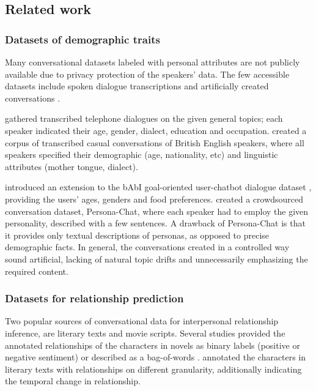 \subsection{Related work}

\subsubsection{Datasets of demographic traits} 

Many conversational datasets labeled with personal attributes are not publicly available due to privacy protection of the speakers' data. The few accessible datasets include spoken dialogue transcriptions \cite{cieri2004fisher, love2017spoken} and artificially created conversations \cite{zhang2018personalizing, pers2}.

\citet{cieri2004fisher} gathered transcribed telephone dialogues on the given general topics; each speaker indicated their age, gender, dialect, education and occupation. \citet{love2017spoken} created a corpus of transcribed casual conversations of British English speakers, where all speakers specified their demographic (age, nationality, etc) and linguistic attributes (mother tongue, dialect). 

\citet{pers2} introduced an extension to the bAbI goal-oriented user-chatbot dialogue dataset \cite{bordes2016learning}, providing the users' ages, genders and food preferences. \citet{zhang2018personalizing} created a crowdsourced conversation dataset, Persona-Chat, where each speaker had to employ the given personality, described with a few sentences. A drawback of Persona-Chat is that it provides only textual descriptions of personas, as opposed to precise demographic facts. 
In general, the conversations created in a controlled way sound artificial, lacking of natural topic drifts and unnecessarily emphasizing the required content.  

\subsubsection{Datasets for relationship prediction} 

Two popular sources of conversational data for interpersonal relationship inference, are literary texts and movie scripts. Several studies provided the annotated relationships of the characters in novels as binary labels (positive or negative sentiment) \cite{chaturvedi2016modeling} or described as a bag-of-words \cite{iyyer2016feuding}. \citet{massey2015annotating} annotated the characters in literary texts with relationships on different granularity, additionally indicating the temporal change in relationship. 

